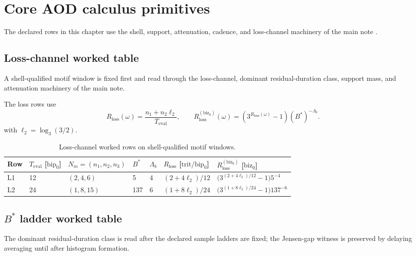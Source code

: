 \section{Core AOD calculus primitives}

The declared rows in this chapter use the shell, support, attenuation, cadence, and loss-channel machinery of the main note \cite{aod43_main_2026}.

\subsection{Loss-channel worked table}
\label{man:loss-channel-worked-table}
A shell-qualified motif window is fixed first and read through the loss-channel, dominant residual-duration class, support mass, and attenuation machinery of the main note.\par\smallskip
{}

The loss rows use
\[
R_{\mathrm{loss}}(\omega)=\frac{n_1+n_2\ell_2}{T_{\mathrm{eval}}},
\qquad
R_{\mathrm{loss}}^{(\mathrm{biz}_0)}(\omega)=\left(3^{R_{\mathrm{loss}}(\omega)}-1\right)(B^*)^{-\Lambda_b}.
\]
with \(\ell_2=\log_3(3/2)\).

\begin{table}[H]
\centering
\caption{Loss-channel worked rows on shell-qualified motif windows.}
\label{tab:manual-loss-channel-worked}
\begin{threeparttable}
\small
\begin{tabular}{@{}lllllll@{}}
\toprule
Row & $T_{\mathrm{eval}}$ [\(\mathrm{bip}_0\)] & $N_m=(n_1,n_2,n_3)$ & $B^*$ & $\Lambda_b$ & $R_{\mathrm{loss}}$ [\(\mathrm{trit}/\mathrm{bip}_0\)] & $R_{\mathrm{loss}}^{(\mathrm{biz}_0)}$ [\(\mathrm{biz}_0\)] \\
\midrule
L1 & 12 & $(2,4,6)$ & 5 & 4 & $(2+4\ell_2)/12$ & $\bigl(3^{(2+4\ell_2)/12}-1\bigr)5^{-4}$ \\
L2 & 24 & $(1,8,15)$ & 137 & 6 & $(1+8\ell_2)/24$ & $\bigl(3^{(1+8\ell_2)/24}-1\bigr)137^{-6}$ \\
\bottomrule
\end{tabular}
\end{threeparttable}
\end{table}

\subsection{\texorpdfstring{$B^*$}{B*} ladder worked table}
\label{man:bstar-ladder-worked-table}
The dominant residual-duration class is read after the declared sample ladders are fixed; the Jensen-gap witness is preserved by delaying averaging until after histogram formation.\par\smallskip
{}

